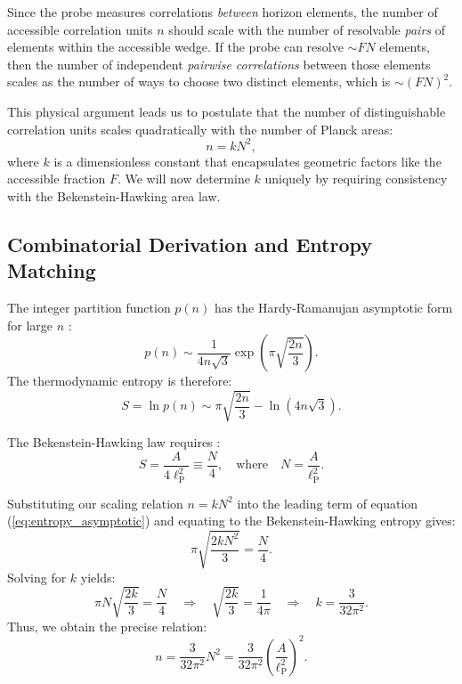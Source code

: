 \documentclass[12pt, letterpaper]{article}
\newcommand{\ellp}{\ell_{\mathrm{P}}}
\begin{document}
Since the probe measures correlations \emph{between} horizon elements, the number of accessible correlation units $n$ should scale with the number of resolvable \emph{pairs} of elements within the accessible wedge. If the probe can resolve $\sim FN$ elements, then the number of independent \emph{pairwise correlations} between those elements scales as the number of ways to choose two distinct elements, which is $\sim (FN)^2$. 

This physical argument leads us to postulate that the number of distinguishable correlation units scales quadratically with the number of Planck areas:
\begin{equation}
n = k N^2,
\end{equation}
where $k$ is a dimensionless constant that encapsulates geometric factors like the accessible fraction $F$. We will now determine $k$ uniquely by requiring consistency with the Bekenstein-Hawking area law.

\subsection{Combinatorial Derivation and Entropy Matching}

The integer partition function $p(n)$ has the Hardy-Ramanujan asymptotic form for large $n$ \cite{Hardy1918}:
\begin{equation}\label{eq:partition}
p(n) \sim \frac{1}{4n\sqrt{3}} \exp\left( \pi \sqrt{\frac{2n}{3}} \right).
\end{equation}
The thermodynamic entropy is therefore:
\begin{equation}\label{eq:entropy_asymptotic}
S = \ln p(n) \sim \pi \sqrt{\frac{2n}{3}} - \ln(4n\sqrt{3}).
\end{equation}

The Bekenstein-Hawking law requires \cite{Bekenstein1972, Hawking1975}:
\begin{equation}\label{eq:BH}
S = \frac{A}{4\ellp^2} \equiv \frac{N}{4}, \quad \text{where} \quad N = \frac{A}{\ellp^2}.
\end{equation}

Substituting our scaling relation $n = k N^2$ into the leading term of equation (\ref{eq:entropy_asymptotic}) and equating to the Bekenstein-Hawking entropy gives:
\begin{equation}\label{eq:leading}
\pi \sqrt{\frac{2k N^2}{3}} = \frac{N}{4}.
\end{equation}
Solving for $k$ yields:
\begin{equation}\label{eq:k_relation}
\pi N \sqrt{\frac{2k}{3}} = \frac{N}{4} \quad \Rightarrow \quad \sqrt{\frac{2k}{3}} = \frac{1}{4\pi} \quad \Rightarrow \quad k = \frac{3}{32\pi^2}.
\end{equation}
Thus, we obtain the precise relation:
\begin{equation}\label{eq:n_relation}
n = \frac{3}{32\pi^2} N^2 = \frac{3}{32\pi^2} \left( \frac{A}{\ellp^2} \right)^2.
\end{equation}
\end{document}
